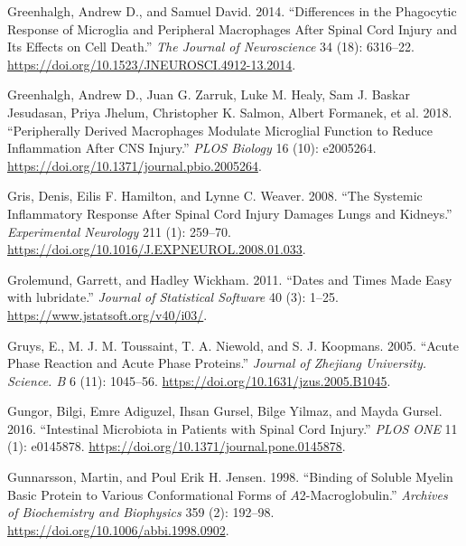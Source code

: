 \documentclass[9pt,lineno]{elife}
\newlength{\cslhangindent}
\newlength{\cslentryspacingunit} %
\newenvironment{CSLReferences}[2] %
 {%
  \setlength{\parindent}{0pt}
  \ifodd #1
  \let\oldpar\par
  \def\par{\hangindent=\cslhangindent\oldpar}
  \fi
  \setlength{\parskip}{#2\cslentryspacingunit}
 }%
 {}
\begin{document}
\begin{CSLReferences}{1}{0}
\leavevmode{}%
Greenhalgh, Andrew D., and Samuel David. 2014. {``Differences in the {Phagocytic Response} of {Microglia} and {Peripheral Macrophages} After {Spinal Cord Injury} and {Its Effects} on {Cell Death}.''} \emph{The Journal of Neuroscience} 34 (18): 6316--22. \url{https://doi.org/10.1523/JNEUROSCI.4912-13.2014}.

\leavevmode{}%
Greenhalgh, Andrew D., Juan G. Zarruk, Luke M. Healy, Sam J. Baskar Jesudasan, Priya Jhelum, Christopher K. Salmon, Albert Formanek, et al. 2018. {``Peripherally Derived Macrophages Modulate Microglial Function to Reduce Inflammation After {CNS} Injury.''} \emph{PLOS Biology} 16 (10): e2005264. \url{https://doi.org/10.1371/journal.pbio.2005264}.

\leavevmode{}%
Gris, Denis, Eilis F. Hamilton, and Lynne C. Weaver. 2008. {``The Systemic Inflammatory Response After Spinal Cord Injury Damages Lungs and Kidneys.''} \emph{Experimental Neurology} 211 (1): 259--70. \url{https://doi.org/10.1016/J.EXPNEUROL.2008.01.033}.

\leavevmode{}%
Grolemund, Garrett, and Hadley Wickham. 2011. {``Dates and Times Made Easy with {lubridate}.''} \emph{Journal of Statistical Software} 40 (3): 1--25. \url{https://www.jstatsoft.org/v40/i03/}.

\leavevmode{}%
Gruys, E., M. J. M. Toussaint, T. A. Niewold, and S. J. Koopmans. 2005. {``Acute Phase Reaction and Acute Phase Proteins.''} \emph{Journal of Zhejiang University. Science. B} 6 (11): 1045--56. \url{https://doi.org/10.1631/jzus.2005.B1045}.

\leavevmode{}%
Gungor, Bilgi, Emre Adiguzel, Ihsan Gursel, Bilge Yilmaz, and Mayda Gursel. 2016. {``Intestinal {Microbiota} in {Patients} with {Spinal Cord Injury}.''} \emph{PLOS ONE} 11 (1): e0145878. \url{https://doi.org/10.1371/journal.pone.0145878}.

\leavevmode{}%
Gunnarsson, Martin, and Poul Erik H. Jensen. 1998. {``Binding of {Soluble Myelin Basic Protein} to {Various Conformational Forms} of {\(A\)}2-{Macroglobulin}.''} \emph{Archives of Biochemistry and Biophysics} 359 (2): 192--98. \url{https://doi.org/10.1006/abbi.1998.0902}.


\end{CSLReferences}
\end{document}
